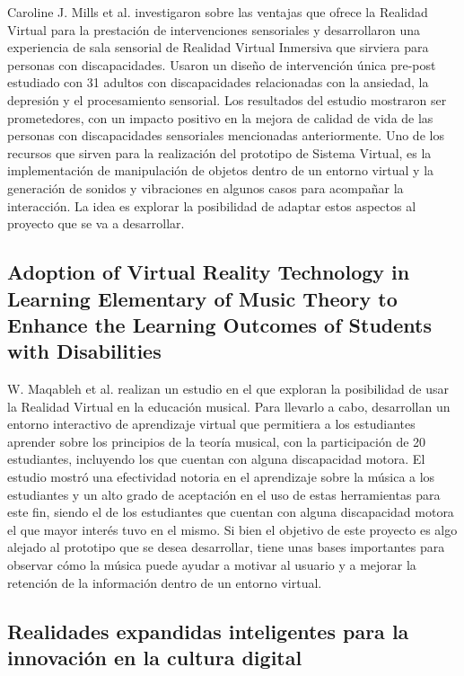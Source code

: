 Caroline J. Mills et al. \cite{13} investigaron sobre las ventajas que ofrece la Realidad Virtual para 
la prestación de intervenciones sensoriales y desarrollaron una experiencia de sala sensorial de Realidad Virtual 
Inmersiva que sirviera para personas con discapacidades. Usaron un diseño de intervención única pre-post estudiado
 con 31 adultos con discapacidades relacionadas con la ansiedad, la depresión y el procesamiento sensorial. 
 Los resultados del estudio mostraron ser prometedores, con un impacto positivo en la mejora de calidad de vida de 
 las personas con discapacidades sensoriales mencionadas anteriormente. Uno de los recursos que sirven para la 
 realización del prototipo de Sistema Virtual, es la implementación de manipulación de objetos dentro de un entorno 
 virtual y la generación de sonidos y vibraciones en algunos casos para acompañar la interacción. La idea es explorar
  la posibilidad de adaptar estos aspectos al proyecto que se va a desarrollar.

\subsection{Adoption of Virtual Reality Technology in Learning Elementary of Music Theory to Enhance the Learning Outcomes of Students with Disabilities}

W. Maqableh et al. \cite{14} realizan un estudio en el que exploran la posibilidad de usar la Realidad 
Virtual en la educación musical. Para llevarlo a cabo, desarrollan un entorno interactivo de aprendizaje virtual 
que permitiera a los estudiantes aprender sobre los principios de la teoría musical, con la participación de 20 estudiantes,
 incluyendo los que cuentan con alguna discapacidad motora. El estudio mostró una efectividad notoria en el aprendizaje 
 sobre la música a los estudiantes y un alto grado de aceptación en el uso de estas herramientas para este fin, siendo el 
  de los estudiantes que cuentan con alguna discapacidad motora el que mayor interés tuvo en el mismo. Si bien el objetivo 
  de este proyecto es algo alejado al prototipo que se desea desarrollar, tiene unas bases importantes para observar cómo 
  la música puede ayudar a motivar al usuario y a mejorar la retención de la información dentro de un entorno virtual.

\subsection{Realidades expandidas inteligentes para la innovación en la cultura digital}

